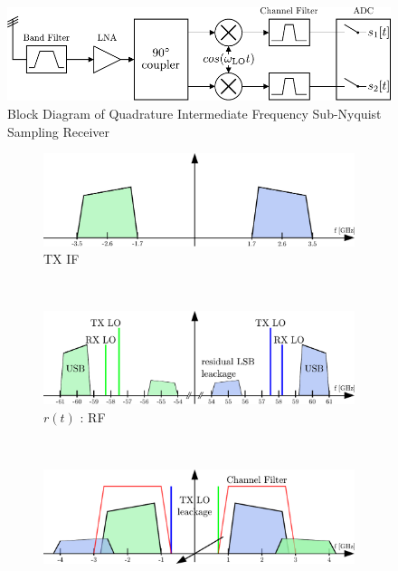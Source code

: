 \begin{figure}[p]
  \centering
  \includegraphics[width=\textwidth]{figures/quad_if_rx_block_diagram}
  \caption{Block Diagram of Quadrature Intermediate Frequency Sub-Nyquist Sampling Receiver}
  \label{fig:rx_2_bd}
\end{figure}

\begin{figure}[p]
  \centering
  \begin{subfigure}{0.45\textwidth}
    \centering
    \includegraphics[width=\textwidth]{figures/rx_2_freq_tx_if}
    \caption{\gls{TX} \gls{IF}}
    \label{fig:rx_2_freq_tx_if}
  \end{subfigure}
  ~
  \begin{subfigure}{0.45\textwidth}
    \centering
    \includegraphics[width=\textwidth]{figures/rx_2_freq_rf}
    \caption{$r(t)$ : \gls{RF}}
    \label{fig:rx_2_freq_rf}
  \end{subfigure}
  \vspace{4ex} \\
  \begin{subfigure}{0.45\textwidth}
    \centering
    \includegraphics[width=\textwidth]{figures/rx_2_freq_a_0}

\end{subfigure}
\end{figure}

